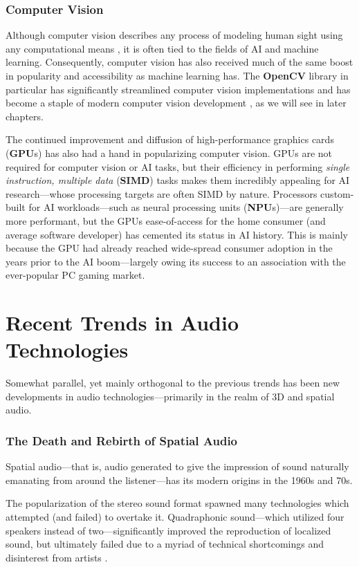 \documentclass{report}
\newcommand{\tech}[1]{\textbf{#1}}
\begin{document}
\subsubsection{Computer Vision}
Although computer vision describes any process of modeling human sight using any computational means \cite{Huang1996ComputerVE}, it is often tied to the fields of AI and machine learning. Consequently, computer vision has also received much of the same boost in popularity and accessibility as machine learning has. The \tech{OpenCV} library in particular has significantly streamlined computer vision implementations and has become a staple of modern computer vision development \cite{culjak2012brief}, as we will see in later chapters.

The continued improvement and diffusion of high-performance graphics cards (\tech{GPU}s) has also had a hand in popularizing computer vision. GPUs are not required for computer vision or AI tasks, but their efficiency in performing \emph{single instruction, multiple data} (\textbf{SIMD}) tasks makes them incredibly appealing for AI research---whose processing targets are often SIMD by nature. Processors custom-built for AI workloads---such as neural processing units (\tech{NPU}s)---are generally more performant, but the GPUs ease-of-access for the home consumer (and average software developer) has cemented its status in AI history. This is mainly because the GPU had already reached wide-spread consumer adoption in the years prior to the AI boom---largely owing its success to an association with the ever-popular PC gaming market.


\section{Recent Trends in Audio Technologies}
Somewhat parallel, yet mainly orthogonal to the previous trends has been new developments in audio technologies---primarily in the realm of 3D and spatial audio.

\subsubsection{The Death and Rebirth of Spatial Audio}
Spatial audio---that is, audio generated to give the impression of sound naturally emanating from around the listener---has its modern origins in the 1960s and 70s. 

The popularization of the stereo sound format spawned many technologies which attempted (and failed) to overtake it. Quadraphonic sound---which utilized four speakers instead of two---significantly improved the reproduction of localized sound, but ultimately failed due to a myriad of technical shortcomings and disinterest from artists \cite{Eguchi_1973}. 
\end{document}

